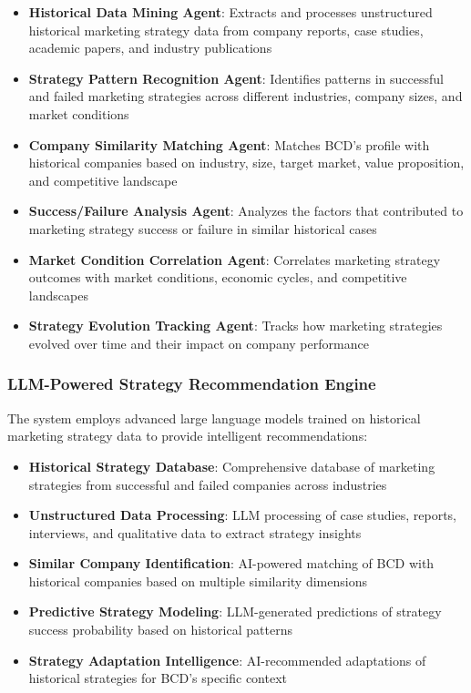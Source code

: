 \begin{itemize}
    \item \textbf{Historical Data Mining Agent}: Extracts and processes unstructured historical marketing strategy data from company reports, case studies, academic papers, and industry publications
    \item \textbf{Strategy Pattern Recognition Agent}: Identifies patterns in successful and failed marketing strategies across different industries, company sizes, and market conditions
    \item \textbf{Company Similarity Matching Agent}: Matches BCD's profile with historical companies based on industry, size, target market, value proposition, and competitive landscape
    \item \textbf{Success/Failure Analysis Agent}: Analyzes the factors that contributed to marketing strategy success or failure in similar historical cases
    \item \textbf{Market Condition Correlation Agent}: Correlates marketing strategy outcomes with market conditions, economic cycles, and competitive landscapes
    \item \textbf{Strategy Evolution Tracking Agent}: Tracks how marketing strategies evolved over time and their impact on company performance
\end{itemize}

\subsubsection{LLM-Powered Strategy Recommendation Engine}

The system employs advanced large language models trained on historical marketing strategy data to provide intelligent recommendations:

\begin{itemize}
    \item \textbf{Historical Strategy Database}: Comprehensive database of marketing strategies from successful and failed companies across industries
    \item \textbf{Unstructured Data Processing}: LLM processing of case studies, reports, interviews, and qualitative data to extract strategy insights
    \item \textbf{Similar Company Identification}: AI-powered matching of BCD with historical companies based on multiple similarity dimensions
    \item \textbf{Predictive Strategy Modeling}: LLM-generated predictions of strategy success probability based on historical patterns
    \item \textbf{Strategy Adaptation Intelligence}: AI-recommended adaptations of historical strategies for BCD's specific context
\end{itemize}

